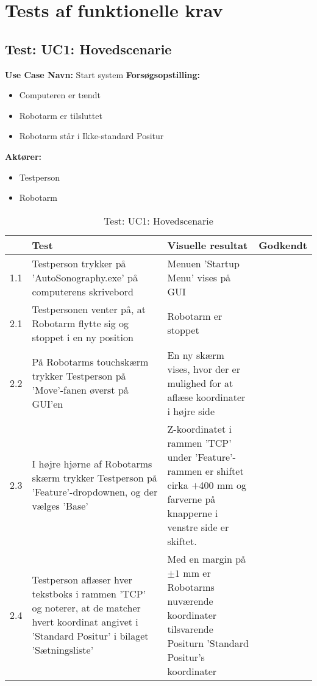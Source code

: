 \chapter{Tests af funktionelle krav}\label{Funktionellekrav}

\section{Test: UC1: Hovedscenarie}
\textbf{Use Case Navn:} Start system \newline
\textbf{Forsøgsopstilling:}
\begin{itemize}
\item Computeren er tændt
\item Robotarm er tilsluttet
\item Robotarm står i Ikke-standard Positur
\end{itemize}  
\textbf{Aktører:}
\begin{itemize}
\item Testperson
\item Robotarm
\end{itemize}  

\begin{table}[htb]
\begin{tabularx}{\textwidth}{|p{0.5cm}|X|X|p{2cm}|}
\hline
\textbf{} & \textbf{Test} & \textbf{Visuelle resultat} &\textbf{Godkendt}
\\
\hline
1.1 &  Testperson trykker på 'AutoSonography.exe' på computerens skrivebord & Menuen 'Startup Menu' vises på GUI &\\\hline
2.1 &  Testpersonen venter på, at Robotarm flytte sig og stoppet i en ny position & Robotarm er stoppet & \\\hline
2.2 &  På Robotarms touchskærm trykker Testperson på 'Move'-fanen øverst på GUI'en & En ny skærm vises, hvor der er mulighed for at aflæse koordinater i højre side & \\ \hline
2.3 &  I højre hjørne af Robotarms skærm trykker Testperson på 'Feature'-dropdownen, og der vælges 'Base' & Z-koordinatet i rammen 'TCP' under 'Feature'-rammen er shiftet cirka $+$400 mm og farverne på knapperne i venstre side er skiftet. & \\ \hline
2.4 & Testperson aflæser hver tekstboks i rammen 'TCP' og noterer, at de matcher hvert koordinat angivet i 'Standard Positur' i bilaget 'Sætningsliste' & Med en margin på $ \pm 1$ mm er Robotarms nuværende koordinater tilsvarende Positurn 'Standard Positur's koordinater & \\ \hline
\end{tabularx}
    \caption{Test: UC1: Hovedscenarie}
    \label{uc1_test_h_label}  
\end{table}
\newpage

